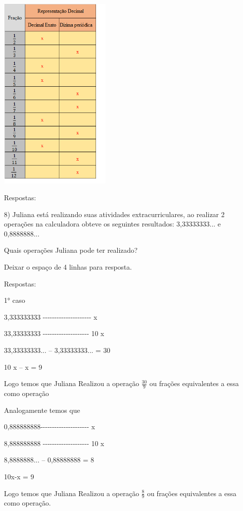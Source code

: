 {\includegraphics[width=2.14722in,height=3.775in]{./imgSAEB_8_MAT/media/image4.png}

Respostas:

8) Juliana está realizando suas atividades extracurriculares, ao
realizar 2 operações na calculadora obteve os seguintes resultados:
3,33333333... e 0,8888888...

Quais operações Juliana pode ter realizado?

Deixar o espaço de 4 linhas para resposta.

Respostas:

1° caso

3,333333333
-\/-\/-\/-\/-\/-\/-\/-\/-\/-\/-\/-\/-\/-\/-\/-\/-\/-\/-\/-\/- x

33,33333333 -\/-\/-\/-\/-\/-\/-\/-\/-\/-\/-\/-\/-\/-\/-\/-\/-\/-\/-\/-
10 x

33,33333333... -- 3,33333333... = 30

10 x -- x = 9

Logo temos que Juliana Realizou a operação \(\frac{30}{9}\) ou frações
equivalentes a essa como operação

Analogamente temos que

0,888888888-\/-\/-\/-\/-\/-\/-\/-\/-\/-\/-\/-\/-\/-\/-\/-\/-\/-\/-\/-\/-
x

8,888888888 -\/-\/-\/-\/-\/-\/-\/-\/-\/-\/-\/-\/-\/-\/-\/-\/-\/-\/-\/-
10 x

8,8888888... -- 0,88888888 = 8

10x-x = 9

Logo temos que Juliana Realizou a operação \(\frac{8}{9}\) ou frações
equivalentes a essa como operação.

}
